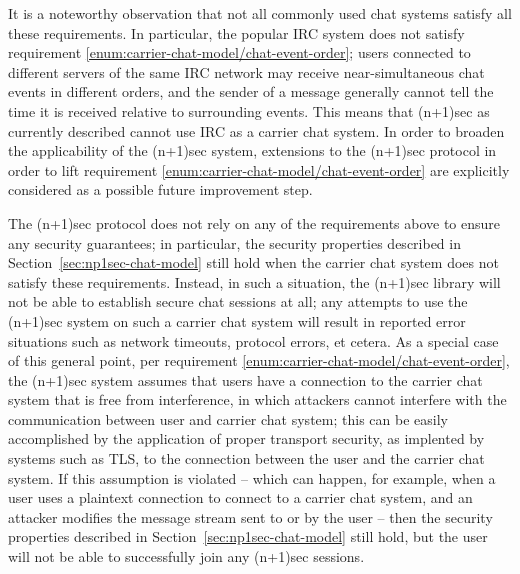 \documentclass{article}
\begin{document}
It is a noteworthy observation that not all commonly used chat systems satisfy all these requirements.
In particular, the popular IRC system does not satisfy requirement \ref{enum:carrier-chat-model/chat-event-order}; users connected to different servers of the same IRC network may receive near-simultaneous chat events in different orders, and the sender of a message generally cannot tell the time it is received relative to surrounding events.
This means that (n+1)sec as currently described cannot use IRC as a carrier chat system.
In order to broaden the applicability of the (n+1)sec system, extensions to the (n+1)sec protocol in order to lift requirement \ref{enum:carrier-chat-model/chat-event-order} are explicitly considered as a possible future improvement step.

The (n+1)sec protocol does not rely on any of the requirements above to ensure any security guarantees; in particular, the security properties described in Section~\ref{sec:np1sec-chat-model} still hold when the carrier chat system does not satisfy these requirements.
Instead, in such a situation, the (n+1)sec library will not be able to establish secure chat sessions at all; any attempts to use the (n+1)sec system on such a carrier chat system will result in reported error situations such as network timeouts, protocol errors, et cetera.
As a special case of this general point, per requirement \ref{enum:carrier-chat-model/chat-event-order}, the (n+1)sec system assumes that users have a connection to the carrier chat system that is free from interference, in which attackers cannot interfere with the communication between user and carrier chat system; this can be easily accomplished by the application of proper transport security, as implented by systems such as TLS, to the connection between the user and the carrier chat system.
If this assumption is violated -- which can happen, for example, when a user uses a plaintext connection to connect to a carrier chat system, and an attacker modifies the message stream sent to or by the user -- then the security properties described in Section~\ref{sec:np1sec-chat-model} still hold, but the user will not be able to successfully join any (n+1)sec sessions.
\end{document}
